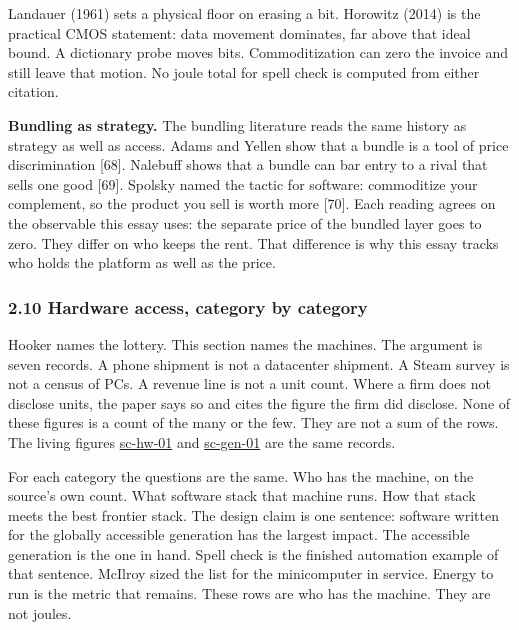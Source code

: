 \documentclass[
  10pt,
]{article}
\begin{document}
Landauer (1961) sets a physical floor on erasing a bit. Horowitz (2014)
is the practical CMOS statement: data movement dominates, far above that
ideal bound. A dictionary probe moves bits. Commoditization can zero the
invoice and still leave that motion. No joule total for spell check is
computed from either citation.

\textbf{Bundling as strategy.} The bundling literature reads the same
history as strategy as well as access. Adams and Yellen show that a
bundle is a tool of price discrimination {[}68{]}. Nalebuff shows that a
bundle can bar entry to a rival that sells one good {[}69{]}. Spolsky
named the tactic for software: commoditize your complement, so the
product you sell is worth more {[}70{]}. Each reading agrees on the
observable this essay uses: the separate price of the bundled layer goes
to zero. They differ on who keeps the rent. That difference is why this
essay tracks who holds the platform as well as the price.

\subsubsection{2.10 Hardware access, category by
category}\label{hardware-access-category-by-category}

Hooker names the lottery. This section names the machines. The argument
is seven records. A phone shipment is not a datacenter shipment. A Steam
survey is not a census of PCs. A revenue line is not a unit count. Where
a firm does not disclose units, the paper says so and cites the figure
the firm did disclose. None of these figures is a count of the many or
the few. They are not a sum of the rows. The living figures
\href{https://research.openie.dev/living/spellcheck/\#sc-hw-01}{sc-hw-01}
and
\href{https://research.openie.dev/living/spellcheck/\#sc-gen-01}{sc-gen-01}
are the same records.

For each category the questions are the same. Who has the machine, on
the source's own count. What software stack that machine runs. How that
stack meets the best frontier stack. The design claim is one sentence:
software written for the globally accessible generation has the largest
impact. The accessible generation is the one in hand. Spell check is the
finished automation example of that sentence. McIlroy sized the list for
the minicomputer in service. Energy to run is the metric that remains.
These rows are who has the machine. They are not joules.
\end{document}
